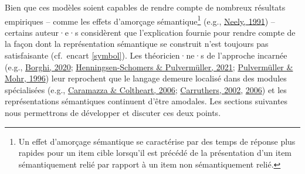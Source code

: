 \documentclass[
  a4paper,12pt,twoside,onecolumn,openright,final,oldfontcommands]{memoir}
\begin{document}
Bien que ces modèles soient capables de rendre compte de nombreux résultats empiriques -- comme les effets d'amorçage sémantique\footnote{Un effet d'amorçage sémantique se caractérise par des temps de réponse plus rapides pour un item cible lorsqu'il est précédé de la présentation d'un item sémantiquement relié par rapport à un item non sémantiquement relié.} (e.g., \protect\hyperlink{ref-neely_semantic_1991}{Neely, 1991}) -- certains auteur·e·s considèrent que l'explication fournie pour rendre compte de la façon dont la représentation sémantique se construit n'est toujours pas satisfaisante (cf.~encart \ref{symbol}). Les théoricien·ne·s de l'approche incarnée (e.g., \protect\hyperlink{ref-borghi_future_2020}{Borghi, 2020}; \protect\hyperlink{ref-henningsen-schomers_modelling_2021}{Henningsen-Schomers \& Pulvermüller, 2021}; \protect\hyperlink{ref-pulvermuller_concept_1996}{Pulvermüller \& Mohr, 1996}) leur reprochent que le langage demeure localisé dans des modules spécialisées (e.g., \protect\hyperlink{ref-caramazza_cognitive_2006}{Caramazza \& Coltheart, 2006}; \protect\hyperlink{ref-carruthers_cognitive_2002}{Carruthers, 2002}, \protect\hyperlink{ref-carruthers_architecture_2006}{2006}) et les représentations sémantiques continuent d'être amodales. Les sections suivantes nous permettrons de développer et discuter ces deux points.

\newpage

\vspace{2mm}
\end{document}
